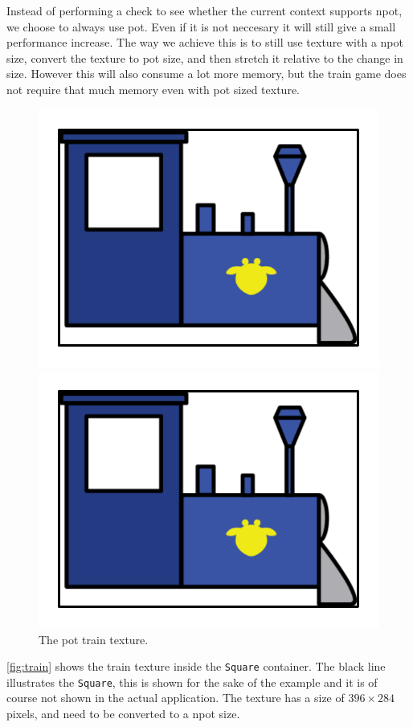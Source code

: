 Instead of performing a check to see whether the current context supports \ac{npot}, we choose to always use \ac{pot}. Even if it is not neccesary it will still give a small performance increase. The way we achieve this is to still use texture with a \ac{npot} size, convert the texture to \ac{pot} size, and then stretch it relative to the change in size. However this will also consume a lot more memory, but the train game does not require that much memory even with \ac{pot} sized texture.
\begin{figure}[H]
\begin{minipage}[b]{0.5\columnwidth}
\centering
\includegraphics[page=1,width=0.8\columnwidth]{img/powerOfTwo.pdf}
\caption{The \ac{npot} train texture inside the \lstinline|Square| container.\label{fig:train}}
\end{minipage}
\hspace{0.5cm}
\begin{minipage}[b]{0.5\columnwidth}
\centering
\includegraphics[page=2,width=0.8\columnwidth]{img/powerOfTwo.pdf}
\caption{The \ac{pot} train texture.\label{fig:trainpot}}
\end{minipage}
\end{figure}
\autoref{fig:train} shows the train texture inside the \lstinline|Square| container. The black line illustrates the \lstinline|Square|, this is shown for the sake of the example and it is of course not shown in the actual application. The texture has a size of $396 \times 284$ pixels, and need to be converted to a \ac{npot} size.

